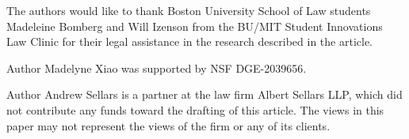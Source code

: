 \begin{acks}

The authors would like to thank Boston University School of Law students Madeleine Bomberg and Will Izenson from the BU/MIT Student Innovations Law Clinic for their legal assistance in the research described in the article.

Author Madelyne Xiao was supported by NSF DGE-2039656.

Author Andrew Sellars is a partner at the law firm Albert Sellars LLP, which did not contribute any funds toward the drafting of this article. The views in this paper may not represent the views of the firm or any of its clients.

\end{acks}



